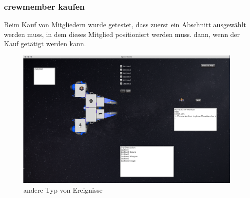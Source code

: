 \documentclass[12pt]{article}
\begin{document}
\subsubsection{crewmember kaufen}
Beim Kauf von Mitgliedern wurde getestet, dass zuerst ein Abschnitt ausgewählt werden muss, in dem dieses Mitglied positioniert werden muss. dann, wenn der Kauf getätigt werden kann.
\begin{figure}[htp]
\centering
\includegraphics[scale=0.3]{TestProtocolBilder/crewmemberkaufen.png}
\caption{andere Typ von Ereignisse}
\end{figure}
\end{document}
